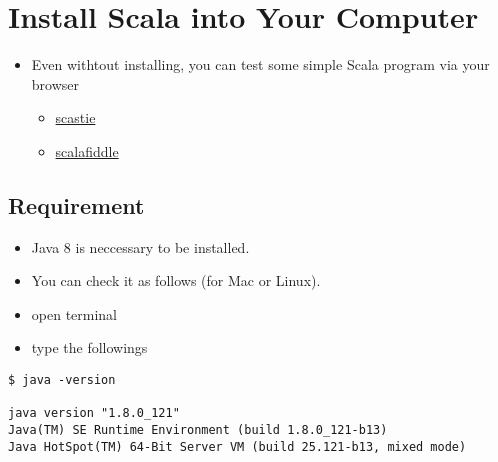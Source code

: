 \documentclass[11pt]{article}
\begin{document}
\section*{Install Scala into Your Computer}
\label{sec:orgheadline5}
\begin{itemize}
\item Even withtout installing, you can test some simple Scala program
via your browser
\begin{itemize}
\item \href{https://scastie.scala-lang.org}{scastie}
\item \href{https://scalafiddle.io}{scalafiddle}
\end{itemize}
\end{itemize}

\subsection*{Requirement}
\label{sec:orgheadline3}
\begin{itemize}
\item Java 8 is neccessary to be installed.
\item You can check it as follows (for Mac or Linux).

\item open terminal
\item type the followings
\end{itemize}
\begin{verbatim}
$ java -version

java version "1.8.0_121"
Java(TM) SE Runtime Environment (build 1.8.0_121-b13)
Java HotSpot(TM) 64-Bit Server VM (build 25.121-b13, mixed mode)
\end{verbatim}
\end{document}
